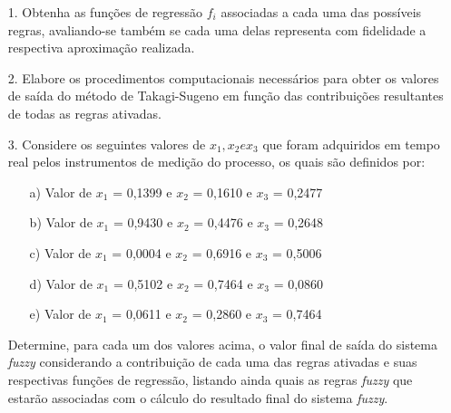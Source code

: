 \documentclass{report}
\begin{document}
\begin{enumerate}
\item[1.] Obtenha as funções de regressão $f_i$ associadas a cada uma das possíveis regras, avaliando-se
também se cada uma delas representa com fidelidade a respectiva aproximação realizada.
\item[2.] Elabore os procedimentos computacionais necessários para obter os valores de saída do
método de Takagi-Sugeno em função das contribuições resultantes de todas as regras
ativadas.
\item[3.] Considere os seguintes valores de $x_1, x_2 e x_3$ que foram adquiridos em tempo real pelos
instrumentos de medição do processo, os quais são definidos por:
\begin{enumerate}
\item[a)]
Valor de $x_1$ = 0,1399 e $x_2$ = 0,1610 e $x_3$ = 0,2477
\item[b)]
Valor de $x_1$ = 0,9430 e $x_2$ = 0,4476 e $x_3$ = 0,2648
\item[c)]
Valor de $x_1$ = 0,0004 e $x_2$ = 0,6916 e $x_3$ = 0,5006
\item[d)]
Valor de $x_1$ = 0,5102 e $x_2$ = 0,7464 e $x_3$ = 0,0860
\item[e)]
Valor de $x_1$ = 0,0611 e $x_2$ = 0,2860 e $x_3$ = 0,7464
\end{enumerate}
Determine, para cada um dos valores acima, o valor final de saída do sistema \emph{fuzzy}
considerando a contribuição de cada uma das regras ativadas e suas respectivas funções de
regressão, listando ainda quais as regras \emph{fuzzy} que estarão associadas com o cálculo do
resultado final do sistema \emph{fuzzy}.
\end{enumerate}
\end{document}
